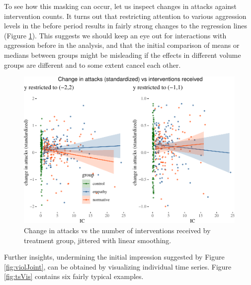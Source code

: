 \documentclass[preprint,12pt]{elsarticle}
\begin{document}
To see how this masking can occur, let us inspect changes in attacks
against intervention counts. It turns out that restricting attention to
various aggression levels in the before period results in fairly strong
changes to the regression lines (Figure \ref{fig:linearShift}). This
suggests we should keep an eye out for interactions with aggression
before in the analysis, and that the initial comparison of means or
medians between groups might be misleading if the effects in different
volume groups are different and to some extent cancel each other.



\begin{figure}

\begin{center}\includegraphics[width=1\linewidth]{figures/fig:linearShift-1} \end{center}
\caption{Change in attacks vs the number of interventions received by treatment group, jittered with  linear smoothing.}
\label{fig:linearShift}
\end{figure}

\normalsize

Further insights, undermining the initial impression suggested by Figure
\ref{fig:violJoint}, can be obtained by visualizing individual time
series. Figure \ref{fig:tsVis} contains six fairly typical examples.
\end{document}
